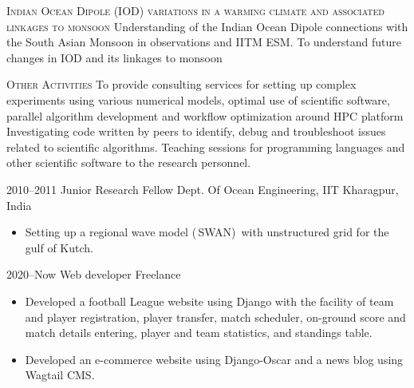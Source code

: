 \documentclass[]{cv-style}          %
\begin{document}
\begin{outline}
    \1 \textsc{Indian Ocean Dipole (IOD) variations in a warming climate and associated linkages to monsoon}
        \2 Understanding of the Indian Ocean Dipole connections with the South Asian Monsoon in observations and IITM ESM.
        \2 To understand future changes in IOD and its linkages to monsoon
    
    \1 \textsc{Other Activities}
        \2 To provide consulting services for setting up complex experiments using various numerical models, optimal use of scientific software, parallel algorithm development and workflow optimization around HPC platform
        \2 Investigating code written by peers to identify, debug and troubleshoot issues related to scientific algorithms.
        \2 Teaching sessions for programming languages and other scientific software to the research personnel.
\end{outline}

\begin{exprlist}
  \expr
  {2010--2011}
  {Junior Research Fellow}
  {Dept. Of Ocean Engineering, IIT Kharagpur, India}
\end{exprlist}
\begin{itemize}
    \item Setting up a regional wave model (\,SWAN)\, with unstructured grid for the gulf of Kutch.
\end{itemize}

\begin{exprlist}
  \expr
  {2020--Now}
  {Web developer}
  {Freelance}
\end{exprlist}
\begin{itemize}
    \item Developed a football League website using Django with the facility of team and player registration, player transfer, match scheduler, on-ground score and match details entering, player and team statistics, and standings table.
    \item Developed an e-commerce website using Django-Oscar and  a news blog using Wagtail CMS.
\end{itemize}
\end{document}
